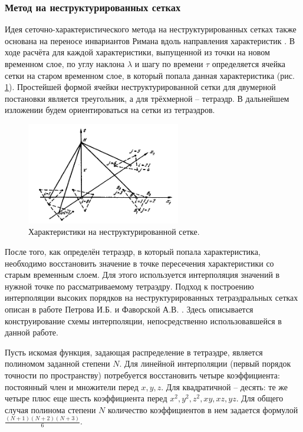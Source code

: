 \subsubsection{Метод на неструктурированных сетках}

Идея сеточно-характеристического метода на неструктурированных сетках также основана на переносе инвариантов Римана вдоль направления характеристик \cite{magomedov}. В ходе расчёта для каждой характеристики, выпущенной из точки на новом временном слое, по углу наклона $\lambda$ и шагу по времени $\tau$ определяется ячейка сетки на старом временном слое, в который попала данная характеристика (рис. \ref{pic:gcm_2d}). Простейшей формой ячейки неструктурированной сетки для двумерной постановки является треугольник, а для трёхмерной -- тетраэдр. В дальнейшем изложении будем ориентироваться на сетки из тетраэдров.

\begin{figure}[h]
\centering
\includegraphics[width=0.6\textwidth]{png/characteristics-2d-triangles-inner.png}
\caption{Характеристики на неструктурированной сетке.}
\label{pic:gcm_2d}
\end{figure}

После того, как определён тетраэдр, в который попала характеристика, необходимо восстановить значение в точке пересечения характеристики со старым временным слоем. Для этого используется интерполяция значений в нужной точке по рассматриваемому тетраэдру. Подход к построению интерполяции высоких порядков на неструктурированных тетраэдральных сетках описан в работе Петрова И.Б. и Фаворской А.В. \cite{interpolation_3d}. Здесь описывается конструирование схемы интерполяции, непосредственно использовавшейся в данной работе.

Пусть искомая функция, задающая распределение в тетраэдре, является полиномом заданной степени $N$. Для линейной интерполяции (первый порядок точности по пространству) потребуется восстановить четыре коэффициента: постоянный член и множители перед $x, y, z$. Для квадратичной -- десять: те же четыре плюс еще шесть коэффициента перед $x^2, y^2, z^2, xy, xz, yz$. Для общего случая полинома степени $N$ количество коэффициентов в нем задается формулой $\frac{(N+1)(N+2)(N+3)}{6}$.

